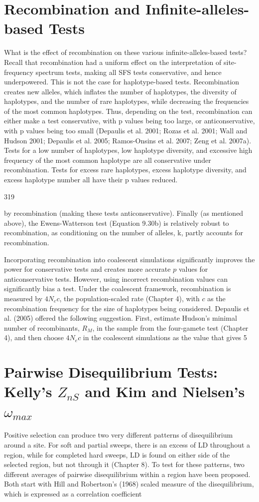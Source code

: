 \documentclass{article}
\begin{document}
\section{Recombination and Infinite-alleles-based Tests}
What is the effect of recombination on these various infinite-alleles-based tests? Recall that recombination had a uniform effect on the interpretation of site-frequency spectrum tests, making all SFS tests conservative, and hence underpowered. This is not the case for haplotype-based tests. Recombination creates new alleles, which inflates the number of haplotypes, the diversity of haplotypes, and the number of rare haplotypes, while decreasing the frequencies of the most common haplotypes. Thus, depending on the test, recombination can either make a test conservative, with p values being too large, or anticonservative, with p values being too small (Depaulis et al. 2001; Rozas et al. 2001; Wall and Hudson 2001; Depaulis et al. 2005; Ramos-Onsins et al. 2007; Zeng et al. 2007a). Tests for a low number of haplotypes, low haplotype diversity, and excessive high frequency of the most common haplotype are all conservative under recombination. Tests for excess rare haplotypes, excess haplotype diversity, and excess haplotype number all have their p values reduced.

319

by recombination (making these tests anticonservative). Finally (as mentioned above), the Ewens-Watterson test (Equation 9.30b) is relatively robust to recombination, as conditioning on the number of alleles, k, partly accounts for recombination.

Incorporating recombination into coalescent simulations significantly improves the power for conservative tests and creates more accurate $p$ values for anticonservative tests. However, using incorrect recombination values can significantly bias a test. Under the coalescent framework, recombination is measured by $4N_{e}c$, the population-scaled rate (Chapter 4), with $c$ as the recombination frequency for the size of haplotypes being considered. Depaulis et al. (2005) offered the following suggestion. First, estimate Hudson's minimal number of recombinants, $R_{M}$, in the sample from the four-gamete test (Chapter 4), and then choose $4N_{e}c$ in the coalescent simulations as the value that gives 5%

\section{Pairwise Disequilibrium Tests: Kelly's  $ Z_{nS} $ and Kim and Nielsen's  $ \omega_{max} $}
Positive selection can produce two very different patterns of disequilibrium around a site. For soft and partial sweeps, there is an excess of LD throughout a region, while for completed hard sweeps, LD is found on either side of the selected region, but not through it (Chapter 8). To test for these patterns, two different averages of pairwise disequilibrium within a region have been proposed. Both start with Hill and Robertson's (1968) scaled measure of the disequilibrium, which is expressed as a correlation coefficient
\end{document}
